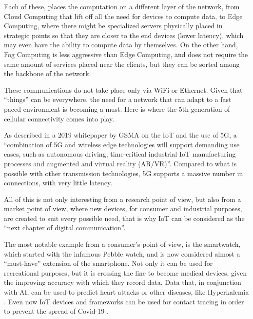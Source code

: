 		Each of these, places the computation on a different layer of the network, from Cloud Computing that lift off all the need for devices to compute data, to Edge Computing, where there might be specialized servers physically placed in strategic points so that they are closer to the end devices (lower latency), which may even have the ability to compute data by themselves.
		On the other hand, Fog Computing is less aggressive than Edge Computing, and does not require the same amount of services placed near the clients, but they can be sorted among the backbone of the network.
		
		These communications do not take place only via WiFi or Ethernet.
		Given that ``things'' can be everywhere, the need for a network that can adapt to a fast paced environment is becoming a must.
		Here is where the 5th generation of cellular connectivity comes into play.
		
		As described in a 2019 whitepaper by GSMA on the IoT and the use of 5G, a ``combination of 5G and wireless edge technologies will support demanding  use cases, such as autonomous driving, time-critical industrial IoT manufacturing processes and  augmented and virtual reality (AR/VR)''\cite{IoT_5g_era}.
		Compared to what is possible with other transmission technologies, 5G supports a massive number in connections, with very little latency.
			
		All of this is not only interesting from a research point of view, but also from a market point of view, where new devices, for consumer and industrial purposes, are created to suit every possible need, that is why IoT can be considered as the ``next chapter of digital communication''.
		
		The most notable example from a consumer's point of view, is the smartwatch, which started with the infamous Pebble watch, and is now considered almost a ``must-have'' extension of the smartphone.
		Not only it can be used for recreational purposes, but it is crossing the line to become medical devices, given the improving accuracy with which they record data.
		Data that, in conjunction with AI, can be used to predict heart attacks \cite{7946780} or other diseases, like Hyperkalemia \cite{HYPERKALEMIA}.
		Even now IoT devices and frameworks can be used for contact tracing in order to prevent the spread of Covid-19 \cite{9181512}.
		
